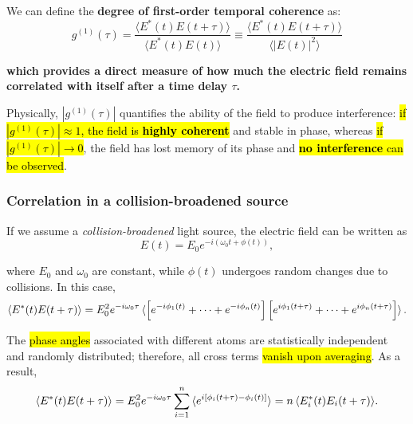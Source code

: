 We can define the \textbf{degree of first-order temporal coherence} as:
\begin{equation}\label{eqn:6-degree-of-first-order-coherence}
g^{(1)}(\tau) = 
\frac{\langle E^*(t)E(t+\tau)\rangle}{\langle E^*(t)E(t)\rangle} \equiv
\frac{\langle E^*(t)E(t+\tau)\rangle}{\langle |E(t)|^2 \rangle}
\end{equation}

\textbf{which provides a direct measure of how much the electric field remains correlated with itself after a time delay $\tau$.}

Physically, $|g^{(1)}(\tau)|$ quantifies the ability of the field to produce interference: \hl{if $|g^{(1)}(\tau)| \approx 1$, the field is \textbf{highly coherent}} and stable in phase, whereas \hl{if $|g^{(1)}(\tau)| \to 0$}, the field has lost memory of its phase and \hl{\textbf{no interference} can be observed}.

\subsubsection{Correlation in a collision-broadened source}

If we assume a \emph{collision-broadened} light source, the electric field can be written as
\begin{equation}\label{eqn:6-collision-broadened-field}
E(t) = E_0 e^{-i(\omega_0 t + \phi(t))},
\end{equation}

where $E_0$ and $\omega_0$ are constant, while $\phi(t)$ undergoes random changes due to collisions. In this case,
\[
\langle E^*(t)E(t+\tau)\rangle
= E_0^2 e^{-i\omega_0 \tau}
\braket{\left[e^{-i\phi_1(t)} + \cdots + e^{-i\phi_n(t)}\right]
\left[e^{i\phi_1(t+\tau)} + \cdots + e^{i\phi_n(t+\tau)}\right]}.
\]

The \hl{phase angles} associated with different atoms are statistically independent and randomly distributed; therefore, all cross terms \hl{vanish upon averaging}. As a result,
\[
\langle E^*(t)E(t+\tau)\rangle
= E_0^2 e^{-i\omega_0 \tau}\sum_{i=1}^{n} \braket{e^{i[\phi_i(t+\tau)-\phi_i(t)]}}
= n \, \langle E_i^*(t)E_i(t+\tau)\rangle.
\]


